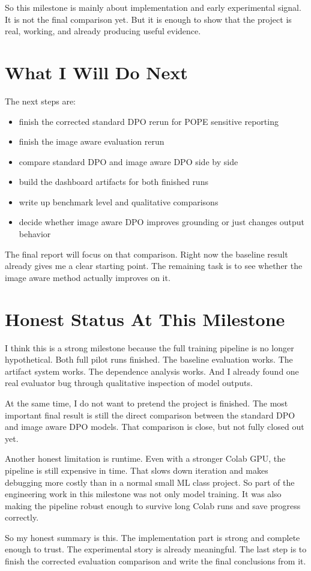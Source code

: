 \documentclass[11pt]{article}
\begin{document}
So this milestone is mainly about implementation and early experimental signal.
It is not the final comparison yet.
But it is enough to show that the project is real, working, and already producing useful evidence.

\section*{What I Will Do Next}
The next steps are:

\begin{itemize}
    \item finish the corrected standard DPO rerun for POPE sensitive reporting
    \item finish the image aware evaluation rerun
    \item compare standard DPO and image aware DPO side by side
    \item build the dashboard artifacts for both finished runs
    \item write up benchmark level and qualitative comparisons
    \item decide whether image aware DPO improves grounding or just changes output behavior
\end{itemize}

The final report will focus on that comparison.
Right now the baseline result already gives me a clear starting point.
The remaining task is to see whether the image aware method actually improves on it.

\section*{Honest Status At This Milestone}
I think this is a strong milestone because the full training pipeline is no longer hypothetical.
Both full pilot runs finished.
The baseline evaluation works.
The artifact system works.
The dependence analysis works.
And I already found one real evaluator bug through qualitative inspection of model outputs.

At the same time, I do not want to pretend the project is finished.
The most important final result is still the direct comparison between the standard DPO and image aware DPO models.
That comparison is close, but not fully closed out yet.

Another honest limitation is runtime.
Even with a stronger Colab GPU, the pipeline is still expensive in time.
That slows down iteration and makes debugging more costly than in a normal small ML class project.
So part of the engineering work in this milestone was not only model training.
It was also making the pipeline robust enough to survive long Colab runs and save progress correctly.

So my honest summary is this.
The implementation part is strong and complete enough to trust.
The experimental story is already meaningful.
The last step is to finish the corrected evaluation comparison and write the final conclusions from it.
\end{document}
